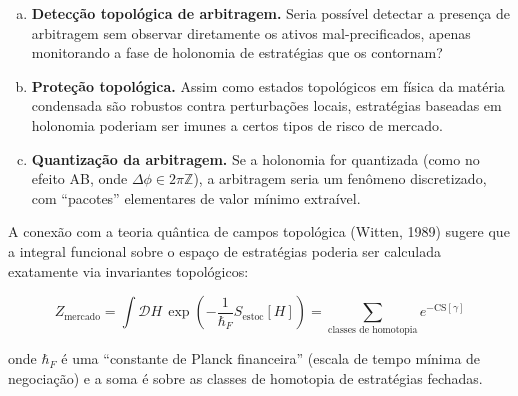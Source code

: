 \begin{enumerate}[(a)]
 \item \textbf{Detec\c{c}\~ao topol\'ogica de arbitragem.} Seria poss\'ivel detectar a presen\c{c}a de arbitragem sem observar diretamente os ativos mal-precificados, apenas monitorando a fase de holonomia de estrat\'egias que os contornam?
 
 \item \textbf{Prote\c{c}\~ao topol\'ogica.} Assim como estados topol\'ogicos em f\'isica da mat\'eria condensada s\~ao robustos contra perturba\c{c}\~oes locais, estrat\'egias baseadas em holonomia poderiam ser imunes a certos tipos de risco de mercado.
 
 \item \textbf{Quantiza\c{c}\~ao da arbitragem.} Se a holonomia for quantizada (como no efeito AB, onde $\Delta\phi \in 2\pi\mathbb{Z}$), a arbitragem seria um fen\^omeno discretizado, com ``pacotes'' elementares de valor m\'inimo extra\'ivel.
\end{enumerate}

A conex\~ao com a teoria qu\^antica de campos topol\'ogica (Witten, 1989) sugere que a integral funcional sobre o espa\c{c}o de estrat\'egias poderia ser calculada exatamente via invariantes topol\'ogicos:

\begin{equation}\label{eq:integral-funcional}
Z_{\text{mercado}} = \int \mathcal{D}H \, \exp\left(-\frac{1}{\hbar_F} S_{\text{estoc}}[H]\right) = \sum_{\text{classes de homotopia}} e^{-\text{CS}[\gamma]}
\end{equation}

onde $\hbar_F$ \'e uma ``constante de Planck financeira'' (escala de tempo m\'inima de negocia\c{c}\~ao) e a soma \'e sobre as classes de homotopia de estrat\'egias fechadas.

